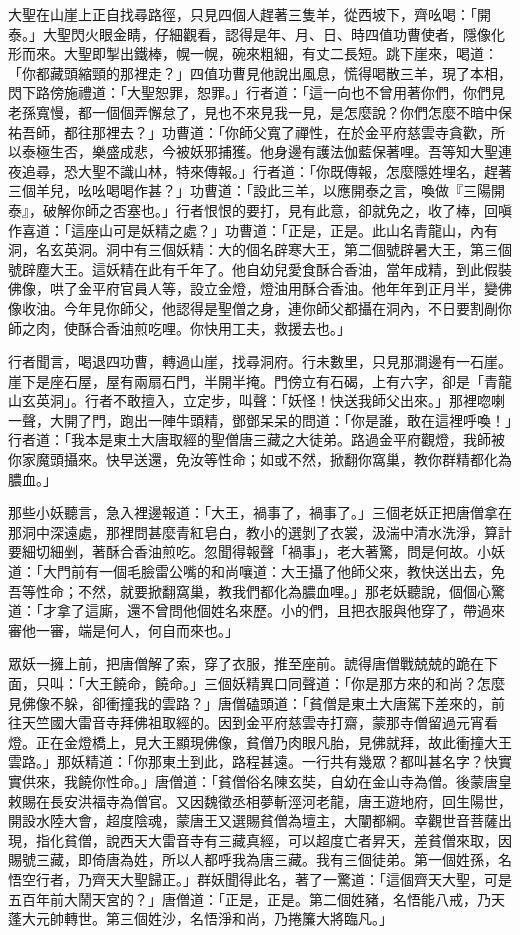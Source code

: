 大聖在山崖上正自找尋路徑，只見四個人趕著三隻羊，從西坡下，齊吆喝：「開泰。」大聖閃火眼金睛，仔細觀看，認得是年、月、日、時四值功曹使者，隱像化形而來。大聖即掣出鐵棒，幌一幌，碗來粗細，有丈二長短。跳下崖來，喝道：「你都藏頭縮頸的那裡走？」四值功曹見他說出風息，慌得喝散三羊，現了本相，閃下路傍施禮道：「大聖恕罪，恕罪。」行者道：「這一向也不曾用著你們，你們見老孫寬慢，都一個個弄懈怠了，見也不來見我一見，是怎麼說？你們怎麼不暗中保祐吾師，都往那裡去？」功曹道：「你師父寬了禪性，在於金平府慈雲寺貪歡，所以泰極生否，樂盛成悲，今被妖邪捕獲。他身邊有護法伽藍保著哩。吾等知大聖連夜追尋，恐大聖不識山林，特來傳報。」行者道：「你既傳報，怎麼隱姓埋名，趕著三個羊兒，吆吆喝喝作甚？」功曹道：「設此三羊，以應開泰之言，喚做『三陽開泰』，破解你師之否塞也。」行者恨恨的要打，見有此意，卻就免之，收了棒，回嗔作喜道：「這座山可是妖精之處？」功曹道：「正是，正是。此山名青龍山，內有洞，名玄英洞。洞中有三個妖精：大的個名辟寒大王，第二個號辟暑大王，第三個號辟塵大王。這妖精在此有千年了。他自幼兒愛食酥合香油，當年成精，到此假裝佛像，哄了金平府官員人等，設立金燈，燈油用酥合香油。他年年到正月半，變佛像收油。今年見你師父，他認得是聖僧之身，連你師父都攝在洞內，不日要割剮你師之肉，使酥合香油煎吃哩。你快用工夫，救援去也。」

行者聞言，喝退四功曹，轉過山崖，找尋洞府。行未數里，只見那澗邊有一石崖。崖下是座石屋，屋有兩扇石門，半開半掩。門傍立有石碣，上有六字，卻是「青龍山玄英洞」。行者不敢擅入，立定步，叫聲：「妖怪！快送我師父出來。」那裡唿喇一聲，大開了門，跑出一陣牛頭精，鄧鄧呆呆的問道：「你是誰，敢在這裡呼喚！」行者道：「我本是東土大唐取經的聖僧唐三藏之大徒弟。路過金平府觀燈，我師被你家魔頭攝來。快早送還，免汝等性命；如或不然，掀翻你窩巢，教你群精都化為膿血。」

那些小妖聽言，急入裡邊報道：「大王，禍事了，禍事了。」三個老妖正把唐僧拿在那洞中深遠處，那裡問甚麼青紅皂白，教小的選剝了衣裳，汲湍中清水洗淨，算計要細切細剉，著酥合香油煎吃。忽聞得報聲「禍事」，老大著驚，問是何故。小妖道：「大門前有一個毛臉雷公嘴的和尚嚷道：大王攝了他師父來，教快送出去，免吾等性命；不然，就要掀翻窩巢，教我們都化為膿血哩。」那老妖聽說，個個心驚道：「才拿了這廝，還不曾問他個姓名來歷。小的們，且把衣服與他穿了，帶過來審他一審，端是何人，何自而來也。」

眾妖一擁上前，把唐僧解了索，穿了衣服，推至座前。諕得唐僧戰兢兢的跪在下面，只叫：「大王饒命，饒命。」三個妖精異口同聲道：「你是那方來的和尚？怎麼見佛像不躲，卻衝撞我的雲路？」唐僧磕頭道：「貧僧是東土大唐駕下差來的，前往天竺國大雷音寺拜佛祖取經的。因到金平府慈雲寺打齋，蒙那寺僧留過元宵看燈。正在金燈橋上，見大王顯現佛像，貧僧乃肉眼凡胎，見佛就拜，故此衝撞大王雲路。」那妖精道：「你那東土到此，路程甚遠。一行共有幾眾？都叫甚名字？快實實供來，我饒你性命。」唐僧道：「貧僧俗名陳玄奘，自幼在金山寺為僧。後蒙唐皇敕賜在長安洪福寺為僧官。又因魏徵丞相夢斬涇河老龍，唐王遊地府，回生陽世，開設水陸大會，超度陰魂，蒙唐王又選賜貧僧為壇主，大闡都綱。幸觀世音菩薩出現，指化貧僧，說西天大雷音寺有三藏真經，可以超度亡者昇天，差貧僧來取，因賜號三藏，即倚唐為姓，所以人都呼我為唐三藏。我有三個徒弟。第一個姓孫，名悟空行者，乃齊天大聖歸正。」群妖聞得此名，著了一驚道：「這個齊天大聖，可是五百年前大鬧天宮的？」唐僧道：「正是，正是。第二個姓豬，名悟能八戒，乃天蓬大元帥轉世。第三個姓沙，名悟淨和尚，乃捲簾大將臨凡。」

